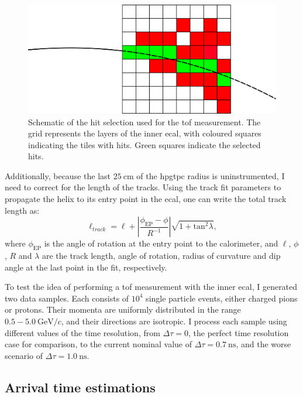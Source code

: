 \begin{figure}[t]
	\centering
	\includegraphics[width=.75\linewidth]{Images/GArSoft_PID/tof/tof_diagram.png}
	\caption[Schematic diagram of the hit selection used for the \gls{ecal} \gls{tof} measurement.]{Schematic of the hit selection used for the \gls{tof} measurement. The grid represents the layers of the inner \gls{ecal}, with coloured squares indicating the tiles with hits. Green squares indicate the selected hits.}
	\label{fig:tof_diagram}
\end{figure}

Additionally, because the last $25~\mathrm{cm}$ of the \gls{hpgtpc} radius is uninstrumented, I need to correct for the length of the tracks. Using the track fit parameters to propagate the helix to its entry point in the \gls{ecal}, one can write the total track length as:
\begin{equation}
	\ell_{track} = \ell + \left| \frac{\phi_{\mathrm{EP}} - \phi}{R^{-1}} \right| \sqrt{1+\mathrm{tan}^{2}\lambda},
\end{equation}
where $\phi_{\mathrm{EP}}$ is the angle of rotation at the entry point to the calorimeter, and $\ell$, $\phi$, $R$ and $\lambda$ are the track length, angle of rotation, radius of curvature and dip angle at the last point in the fit, respectively.

To test the idea of performing a \gls{tof} measurement with the inner \gls{ecal}, I generated two data samples. Each consists of $10^{4}$ single particle events, either charged pions or protons. Their momenta are uniformly distributed in the range $0.5-5.0~\mathrm{GeV}/c$, and their directions are isotropic. I process each sample using different values of the time resolution, from $\Delta \tau = 0$, the perfect time resolution case for comparison, to the current nominal value of $\Delta \tau = 0.7~\mathrm{ns}$, and the worse scenario of $\Delta \tau = 1.0~\mathrm{ns}$.

\subsection{Arrival time estimations}

